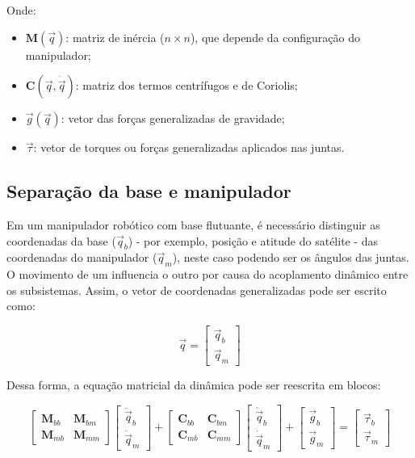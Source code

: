 Onde:
\begin{itemize}
    \item $\mathbf{M}(\vec{q})$: matriz de inércia ($n \times n$), que depende da configuração do manipulador;
    \item $\mathbf{C}(\vec{q}, \dot{\vec{q}})$: matriz dos termos centrífugos e de Coriolis;
    \item $\vec{g}(\vec{q})$: vetor das forças generalizadas de gravidade;
    \item $\vec{\tau}$: vetor de torques ou forças generalizadas aplicados nas juntas.
\end{itemize}


\subsection{Separação da base e manipulador}
Em um manipulador robótico com base flutuante, é necessário distinguir as coordenadas da base ($\vec{q}_b$) - por exemplo, posição e atitude do satélite - das coordenadas do manipulador ($\vec{q}_m$), neste caso podendo ser os ângulos das juntas. 
O movimento de um influencia o outro por causa do acoplamento dinâmico entre os subsistemas. 
Assim, o vetor de coordenadas generalizadas pode ser escrito como:

\begin{equation}
\vec{q} =
\begin{bmatrix}
\vec{q}_b \\
\vec{q}_m
\end{bmatrix}
\end{equation}

Dessa forma, a equação matricial da dinâmica pode ser reescrita em blocos:

\begin{equation}
\begin{bmatrix}
\mathbf{M}_{bb} & \mathbf{M}_{bm} \\
\mathbf{M}_{mb} & \mathbf{M}_{mm}
\end{bmatrix}
\begin{bmatrix}
\ddot{\vec{q}}_b \\
\ddot{\vec{q}}_m
\end{bmatrix}
+
\begin{bmatrix}
\mathbf{C}_{bb} & \mathbf{C}_{bm} \\
\mathbf{C}_{mb} & \mathbf{C}_{mm}
\end{bmatrix}
\begin{bmatrix}
\dot{\vec{q}}_b \\
\dot{\vec{q}}_m
\end{bmatrix}
+
\begin{bmatrix}
\vec{g}_b \\
\vec{g}_m
\end{bmatrix}
=
\begin{bmatrix}
\vec{\tau}_b \\
\vec{\tau}_m
\end{bmatrix}
\end{equation}


